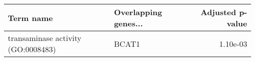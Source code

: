 \begin{tabular}{llr}
\toprule
                         Term name & Overlapping genes... &  Adjusted p-value \\
\midrule
transaminase activity (GO:0008483) &                BCAT1 &          1.10e-03 \\
\bottomrule
\end{tabular}
